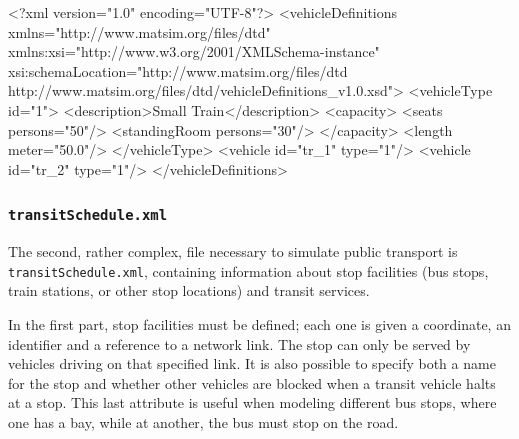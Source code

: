 \begin{xml}
<?xml version="1.0" encoding="UTF-8"?> 
<vehicleDefinitions xmlns="http://www.matsim.org/files/dtd" 
       xmlns:xsi="http://www.w3.org/2001/XMLSchema-instance" 
       xsi:schemaLocation="http://www.matsim.org/files/dtd 
			  http://www.matsim.org/files/dtd/vehicleDefinitions_v1.0.xsd"> 
	<vehicleType id="1"> 
      <description>Small Train</description> 
      <capacity> 
         <seats persons="50"/> 
         <standingRoom persons="30"/> 
      </capacity> 
      <length meter="50.0"/> 
   </vehicleType> 
   <vehicle id="tr_1" type="1"/> 
   <vehicle id="tr_2" type="1"/> 
</vehicleDefinitions>
\end{xml}

\subsubsection{\lstinline|transitSchedule.xml|}
\label{sec:inputdata:transitschedule}
The second, rather complex, file necessary to simulate public transport is \lstinline|transitSchedule.xml|, containing information about stop facilities (bus stops, train stations, or other stop locations) and transit services.

In the first part, stop facilities must be defined; each one is given a coordinate, an identifier and a reference to a network link. The stop can only be served by vehicles driving on that specified link. It is also possible to specify both a name for the stop and whether other vehicles are blocked when a transit vehicle halts at a stop. This last attribute is useful when modeling \eg different bus stops, where one has a bay, while at another, the bus must stop on the road.

